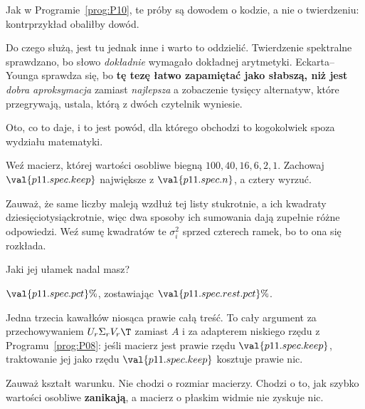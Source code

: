 \begin{fr}
Jak w Programie~\ref{prog:P10}, te próby są dowodem o kodzie, a nie o
twierdzeniu: kontrprzykład obaliłby dowód.

Do czego służą, jest tu jednak inne i warto to oddzielić. Twierdzenie
spektralne sprawdzano, bo słowo \emph{dokładnie} wymagało dokładnej arytmetyki.
Eckarta--Younga sprawdza się, bo \textbf{tę tezę łatwo zapamiętać jako
słabszą, niż jest} \dash{} \emph{dobra aproksymacja} zamiast \emph{najlepsza}
\dash{} a zobaczenie tysięcy alternatyw, które przegrywają, ustala, którą z
dwóch czytelnik wyniesie.
\end{fr}

\begin{fr}
Oto, co to daje, i to jest powód, dla którego obchodzi to kogokolwiek spoza
wydziału matematyki.

Weź macierz, której wartości osobliwe biegną $100, 40, 16, 6, 2, 1$. Zachowaj
$\val{p11.spec.keep}$ największe z $\val{p11.spec.n}$, a cztery wyrzuć.

Zauważ, że same liczby maleją wzdłuż tej listy stukrotnie, a ich kwadraty
dziesięciotysiąckrotnie, więc dwa sposoby ich sumowania dają zupełnie różne
odpowiedzi. Weź sumę kwadratów \dash{} te $\sigma_i^{2}$ sprzed czterech ramek,
bo to ona się rozkłada.

Jaki jej ułamek nadal masz?
\dotline
\nextframe
\end{fr}

\begin{fr}
\begin{ansblock}
$\val{p11.spec.pct}\%$, zostawiając $\val{p11.spec.rest.pct}\%$.
\end{ansblock}

Jedna trzecia kawałków niosąca prawie całą treść. To cały argument za
przechowywaniem $U_r\Sigma_r V_r\T$ zamiast $A$ i za adapterem niskiego rzędu z
Programu~\ref{prog:P08}: jeśli macierz jest prawie rzędu
$\val{p11.spec.keep}$, traktowanie jej jako rzędu $\val{p11.spec.keep}$
kosztuje prawie nic.

Zauważ kształt warunku. Nie chodzi o rozmiar macierzy. Chodzi o to, jak szybko
wartości osobliwe \textbf{zanikają}, a macierz o płaskim widmie nie zyskuje
nic.
\end{fr}

